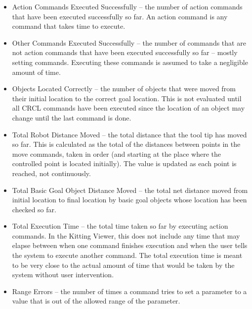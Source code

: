 \begin{itemize}

\item \small \sf Action Commands Executed Successfully \rm \normalsize --
the number of action commands that have been executed successfully so far.
An action command is any command that takes time to execute.

\item \small \sf Other Commands Executed Successfully \rm \normalsize --
the number of commands that are not action commands that have been executed
successfully so far -- mostly setting commands. Executing these commands is
assumed to take a negligible amount of time.

\item \small \sf Objects Located Correctly \rm \normalsize -- the number of
objects that were moved from their initial location to the correct goal
location. This is not evaluated until all CRCL commands have been executed
since the location of an object may change until the last command is
done.

\item \small \sf Total Robot Distance Moved \rm \normalsize -- the total
distance that the tool tip has moved so far. This is calculated as the
total of the distances between points in the move commands, taken in order
(and starting at the place where the controlled point is located
initially). The value is updated as each point is reached, not
continuously.

\item \small \sf Total Basic Goal Object Distance Moved \rm \normalsize --
the total net distance moved from initial location to final location by
basic goal objects whose location has been checked so far.

\item \small \sf Total Execution Time \rm \normalsize -- the total time
taken so far by executing action commands. In the Kitting Viewer, this does
not include any time that may elapse between when one command finishes
execution and when the user tells the system to execute another command.
The total execution time is meant to be very close to the actual amount of
time that would be taken by the system without user intervention.

\item \small \sf Range Errors \rm \normalsize -- the number of times a
command tries to set a parameter to a value that is out of the allowed
range of the parameter.


\end{itemize}
